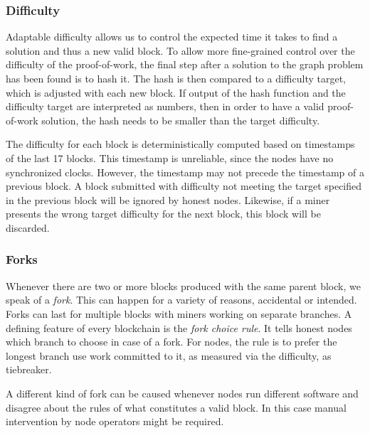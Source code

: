 \subsubsection{Difficulty}

Adaptable difficulty allows us to control the expected time it takes to find
a solution and thus a new valid block. To allow more fine-grained control over
the difficulty of the proof-of-work, the final step after a solution to the
graph problem has been found is to hash it.
The hash is then compared to a difficulty target, which is adjusted with
each new block. If output of the hash function and the difficulty target are
interpreted as numbers, then in order to have a valid proof-of-work solution,
the hash needs to be smaller than the target difficulty.

The difficulty for each block is deterministically computed based on timestamps
of the last 17 blocks. This timestamp is unreliable, since the nodes have no
synchronized clocks. However, the timestamp may not precede the timestamp of a
previous block. A block submitted with difficulty not meeting the target
specified in the previous block will be ignored by honest nodes.
Likewise, if a miner presents the wrong target difficulty for the next block,
this block will be discarded.

\subsubsection{Forks}

Whenever there are two or more blocks produced with the same parent block, we
speak of a \textit{fork}. This can happen for a variety of reasons, accidental
or intended. Forks can last for multiple blocks with miners working on separate
branches.
A defining feature of every blockchain is the \textit{fork choice rule}. It
tells honest nodes which branch to choose in case of a fork. For \aet nodes,
the rule is to prefer the longest branch use work committed to it, as measured
via the difficulty, as tiebreaker.

A different kind of fork can be caused whenever nodes run different software
and disagree about the rules of what constitutes a valid block. In this case
manual intervention by node operators might be required.


